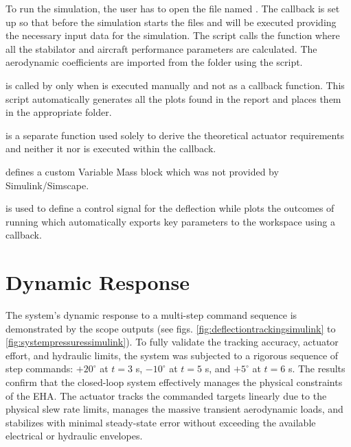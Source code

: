 \documentclass[
bindingoffset=5mm,  %
footnoteindent=3mm, %
hyphenation=true    %
]{src/wut-thesis}
\begin{document}
	To run the simulation, the user has to open the file named . The callback is set up so that before the simulation starts the files  and  will be executed providing the necessary input data for the simulation. The  script calls the  function where all the stabilator and aircraft performance parameters are calculated. The aerodynamic coefficients are imported from the  folder using the  script. 
	
	 is called by  only when  is executed manually and not as a callback function. This script automatically generates all the plots found in the report and places them in the appropriate folder.
	
	 is a separate function used solely to derive the theoretical actuator requirements and neither it nor  is executed within the callback.
	
	 defines a custom Variable Mass block which was not provided by Simulink/Simscape.
	
	 is used to define a control signal for the deflection while  plots the outcomes of running  which automatically exports key parameters to the workspace using a callback.

	\section{Dynamic Response}
	
	The system's dynamic response to a multi-step command sequence is demonstrated by the scope outputs (see figs. \ref{fig:deflectiontrackingsimulink} to \ref{fig:systempressuressimulink}). To fully validate the tracking accuracy, actuator effort, and hydraulic limits, the system was subjected to a rigorous sequence of step commands: $+20^\circ$ at $t = 3$ s, $-10^\circ$ at $t = 5$ s, and $+5^\circ$ at $t = 6$ s. The results confirm that the closed-loop system effectively manages the physical constraints of the EHA. The actuator tracks the commanded targets linearly due to the physical slew rate limits, manages the massive transient aerodynamic loads, and stabilizes with minimal steady-state error without exceeding the available electrical or hydraulic envelopes.
	
\end{document}
